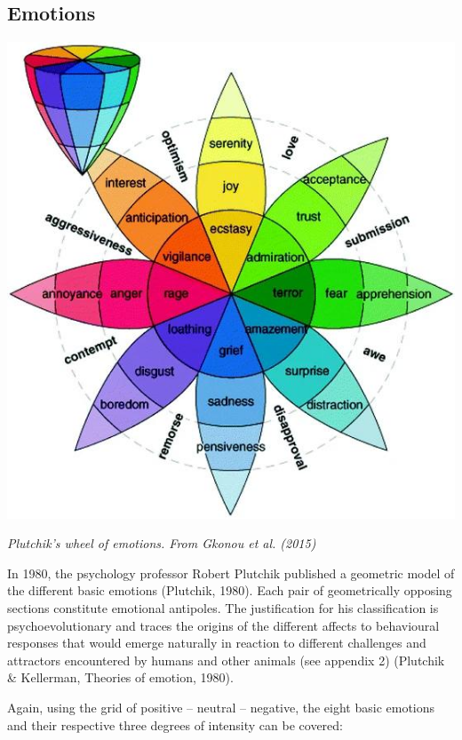 \subsection{Emotions}

\begin{center}
	\includegraphics[scale=0.45]{./Images/emotions.jpg}

	{\it \footnotesize Plutchik's wheel of emotions. From Gkonou et al. (2015)}
\end{center}

\noindent In 1980, the psychology professor Robert Plutchik published a geometric model of the different basic emotions  (Plutchik, 1980). Each pair of geometrically opposing sections constitute emotional antipoles. The justification for his classification is psychoevolutionary and traces the origins of the different affects to behavioural responses that would emerge naturally in reaction to different challenges and attractors encountered by humans and other animals (see appendix 2) (Plutchik \& Kellerman, Theories of emotion, 1980).  

Again, using the grid of positive – neutral – negative, the eight basic emotions and their respective three degrees of intensity can be covered: 

